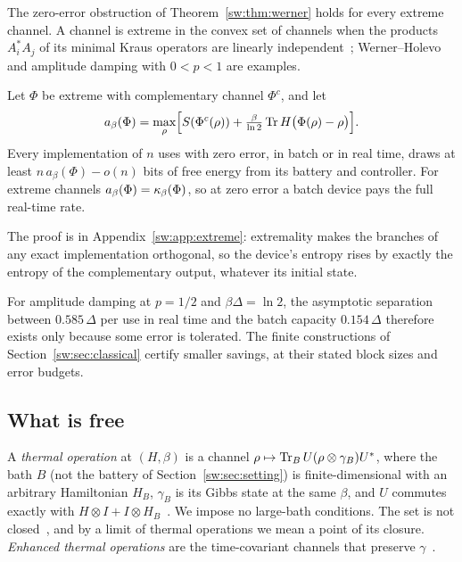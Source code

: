 The zero-error obstruction of Theorem~\ref{sw:thm:werner} holds for every extreme channel. A channel is extreme in the convex set of channels when the products $A_i^*A_j$ of its minimal Kraus operators are linearly independent~\cite{Choi75}; Werner--Holevo and amplitude damping with $0<p<1$ are examples.

\begin{proposition}\label{sw:prop:extreme}
Let $\Phi$ be extreme with complementary channel $\Phi^c$, and let
\[
a_\beta(\Phi)=\max_\rho\Bigl[S(\Phi^c(\rho))+\tfrac{\beta}{\ln2}\operatorname{Tr} H\bigl(\Phi(\rho)-\rho\bigr)\Bigr].
\]
Every implementation of $n$ uses with zero error, in batch or in real time, draws at least $n\,a_\beta(\Phi)-o(n)$ bits of free energy from its battery and controller. For extreme channels $a_\beta(\Phi)=\kappa_\beta(\Phi)$, so at zero error a batch device pays the full real-time rate.
\end{proposition}

The proof is in Appendix~\ref{sw:app:extreme}: extremality makes the branches of any exact implementation orthogonal, so the device's entropy rises by exactly the entropy of the complementary output, whatever its initial state.

For amplitude damping at $p=1/2$ and $\beta\Delta=\ln2$, the asymptotic separation between $0.585\,\Delta$ per use in real time and the batch capacity $0.154\,\Delta$ therefore exists only because some error is tolerated. The finite constructions of Section~\ref{sw:sec:classical} certify smaller savings, at their stated block sizes and error budgets.

\subsection{What is free}\label{sw:sec:free}

A \emph{thermal operation} at $(H,\beta)$ is a channel $\rho\mapsto\operatorname{Tr}_BU(\rho\otimes\gamma_B)U^*$, where the bath $B$ (not the battery of Section~\ref{sw:sec:setting}) is finite-dimensional with an arbitrary Hamiltonian $H_B$, $\gamma_B$ is its Gibbs state at the same $\beta$, and $U$ commutes exactly with $H\otimes I+I\otimes H_B$~\cite{Janzing00,HorodeckiOppenheim13,Brandao13,vomEnde22,LieEtAl26}. We impose no large-bath conditions. The set is not closed~\cite{vomEnde22}, and by a limit of thermal operations we mean a point of its closure. \emph{Enhanced thermal operations} are the time-covariant channels that preserve $\gamma$~\cite{Cwiklinski15}.

